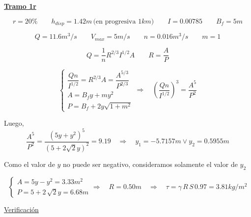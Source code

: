 \underline{\bf Tramo 1r}


\begin{equation*}
  r = 20\%
  \qquad
  h_{disp} = 1.42 m \,\text{(en progresiva }1 km \text{)}
 \qquad
  I = 0.00785
  \qquad
  B_{f} = 5 m
\end{equation*}

\begin{equation*}
  Q = 11.6 m^3/s
 \qquad
  V_{max} = 5 m/s
 \qquad
  n = 0.016 m^3/s
 \qquad
  m = 1
\end{equation*}

\begin{equation*}
 Q = \frac{1}{n} R^{2/3} I^{1/2} A
 \qquad
 R = \frac{A}{P}
\end{equation*}

\begin{equation*}
  \begin{cases}
    \dfrac{Q n}{I^{1/2}} = R^{2/3} A = \dfrac{A^{5/3}}{P^{2/3}} \\
    A = B_{f}y + m y^{2} \\
    P = B_{f} + 2 y \sqrt{1 + m^{2}}
  \end{cases}
  \Longrightarrow \quad
  (\dfrac{Q n}{I^{1/2}})^{3} = \dfrac{A^{5}}{P^{2}}
\end{equation*}

Luego,
\begin{equation*}
  \dfrac{A^{5}}{P^{2}} = \dfrac{(5 y + y^{2})^{5}}{(5 + 2 \sqrt{2} y)^{2}} = 9.19
  \quad
  \Longrightarrow
  \quad
  y_{1} = -5.7157 m \vee y_{2} = 0.5955 m
\end{equation*}

Como el valor de $y$ no puede ser negativo, consideramos solamente el valor de $y_{2}$

\begin{equation*}
  \begin{cases}
    A = 5 y - y^{2} = 3.33 m^{2} \\
    P = 5 + 2 \, \sqrt{2} y = 6.68 m
  \end{cases}
  \Longrightarrow
  \quad
  R = 0.50 m
  \quad
  \Longrightarrow
  \quad
  \tau = \gamma \, R \, S \, 0.97 = 3.81 kg/m^{2}
\end{equation*}

\underline{Verificación}

